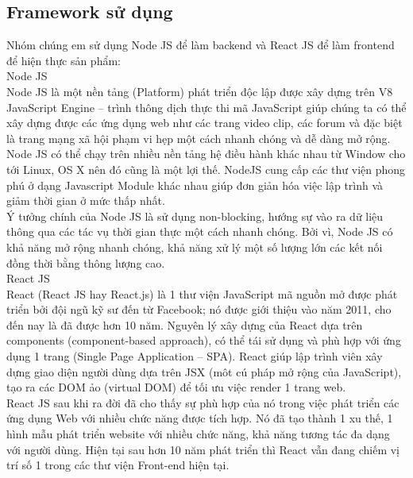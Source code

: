 \documentclass{article}
\begin{document}
{{{{{{{{{{{{{{{{{\subsection{Framework sử dụng }
{\large Nhóm chúng em sử dụng Node JS để làm backend và React JS để làm frontend để hiện thực sản phẩm: \\ 
	\indent Node JS\\
	\indent Node JS  là một nền tảng (Platform) phát triển độc lập được xây dựng trên V8 JavaScript Engine – trình thông dịch thực thi mã JavaScript giúp chúng ta có thể xây dựng được các ứng dụng web như các trang video clip, các forum và đặc biệt là trang mạng xã hội phạm vi hẹp một cách nhanh chóng và dễ dàng mở rộng.\\
\indent	Node JS có thể chạy trên nhiều nền tảng hệ điều hành khác nhau từ Window cho tới Linux, OS X nên đó cũng là một lợi thế. NodeJS cung cấp các thư viện phong phú ở dạng Javascript Module khác nhau giúp đơn giản hóa việc lập trình và giảm thời gian ở mức thấp nhất.\\
\indent Ý tưởng chính của Node JS là sử dụng non-blocking, hướng sự vào ra dữ liệu thông qua các tác vụ thời gian thực một cách nhanh chóng. Bởi vì, Node JS có khả năng mở rộng nhanh chóng, khả năng xử lý một số lượng lớn các kết nối đồng thời bằng thông lượng cao.\\

\indent	React JS\\
\indent React (React JS hay React.js) là 1 thư viện JavaScript mã nguồn mở được phát triển bởi đội ngũ kỹ sư đến từ Facebook; nó được giới thiệu vào năm 2011, cho đến nay là đã được hơn 10 năm. Nguyên lý xây dựng của React dựa trên components (component-based approach), có thể tái sử dụng và phù hợp với ứng dụng 1 trang (Single Page Application – SPA). React giúp lập trình viên xây dựng giao diện người dùng dựa trên JSX (môt cú pháp mở rộng của JavaScript), tạo ra các DOM ảo (virtual DOM) để tối ưu việc render 1 trang web.\\
\indent React JS sau khi ra đời đã cho thấy sự phù hợp của nó trong việc phát triển các ứng dụng Web với nhiều chức năng được tích hợp. Nó đã tạo thành 1 xu thế, 1 hình mẫu phát triển website với nhiều chức năng, khả năng tương tác đa dạng với người dùng. Hiện tại sau hơn 10 năm phát triển thì React vẫn đang chiếm vị trí số 1 trong các thư viện Front-end hiện tại.\\

	
}



\newpage

}}}}}}}}}}}}}}}}}
\end{document}
